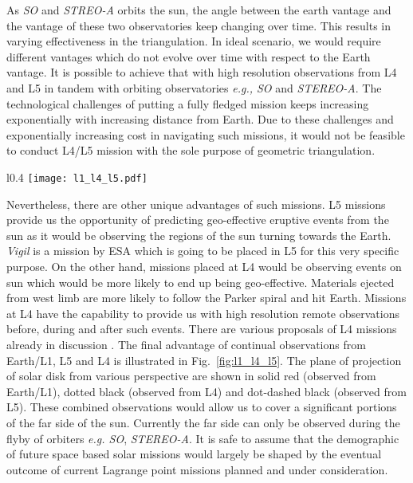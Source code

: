 As {\it SO} and {\it STREO-A} orbits the sun, the angle between the earth vantage and the vantage of these two observatories keep changing over time. This results in varying effectiveness in the triangulation. In ideal scenario, we would require different vantages which do not evolve over time with respect to the Earth vantage. It is possible to achieve that with high resolution observations from L4 and L5 in tandem with orbiting observatories {\it e.g., SO} and {\it STEREO-A}. The technological challenges of putting a fully fledged mission keeps increasing exponentially with increasing distance from Earth. Due to these challenges and exponentially increasing cost in navigating such missions, it would not be feasible to conduct L4/L5 mission with the sole purpose of geometric triangulation.

    \begin{wrapfigure}{l}{0.4\textwidth}
    \centering
    \texttt{[image: l1\_l4\_l5.pdf]}
    \caption[Coverage of the solar surface with observations from various vantages.]{The Plane of projection of sun as seen from different vantages: solid red (observed from earth/L1), dotted black (observed from L4) and black dot-dashed (observed from L5). Figure is not to scale.}
    \label{fig:l1_l4_l5}
    \end{wrapfigure}
    
Nevertheless, there are other unique advantages of such missions. L5 missions provide us the opportunity of predicting geo-effective eruptive events from the sun as it would be observing the regions of the sun turning towards the Earth. {\it Vigil} \citep{vigil} is a mission by ESA which is going to be placed in L5 for this very specific purpose. On the other hand, missions placed at L4 would be observing events on sun which would be more likely to end up being geo-effective. Materials ejected from west limb are more likely to follow the Parker spiral and hit Earth. Missions at L4 have the capability to provide us with high resolution remote observations before, during and after such events. There are various proposals of L4 missions already in discussion \citep{cho23}. The final advantage of continual observations from Earth/L1, L5 and L4 is illustrated in Fig.~\ref{fig:l1_l4_l5}. The plane of projection of solar disk from various perspective are shown in solid red (observed from Earth/L1), dotted black (observed from L4) and dot-dashed black (observed from L5). These combined observations would allow us to cover a significant portions of the far side of the sun. Currently the far side can only be observed during the flyby of orbiters {\it e.g. SO}, {\it STEREO-A}. It is safe to assume that the demographic of future space based solar missions would largely be shaped by the eventual outcome of current Lagrange point missions planned and under consideration. 

